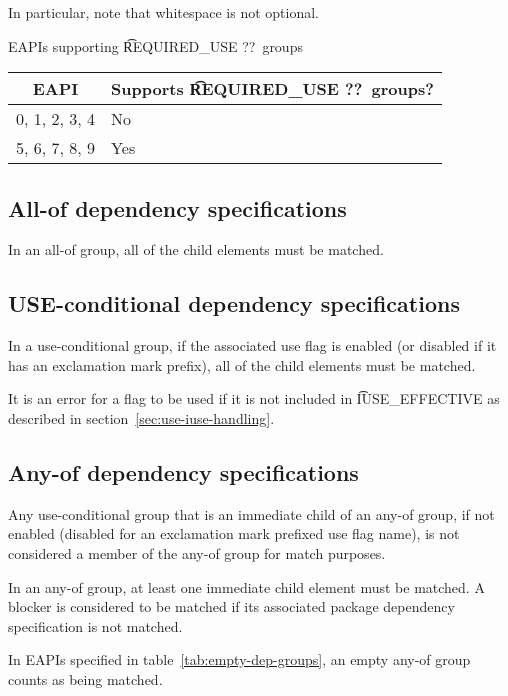 In particular, note that whitespace is not optional.

\begin{centertable}{EAPIs supporting \t{REQUIRED_USE ??}\ groups}
    \label{tab:at-most-one-of-table}
    \begin{tabular}{ll}
      \toprule
      \multicolumn{1}{c}{\textbf{EAPI}} &
      \multicolumn{1}{c}{\textbf{Supports \t{REQUIRED_USE ??}\ groups?}} \\
      \midrule
      0, 1, 2, 3, 4     & No  \\
      5, 6, 7, 8, 9     & Yes \\
      \bottomrule
    \end{tabular}
\end{centertable}

\subsection{All-of dependency specifications}

In an all-of group, all of the child elements must be matched.

\subsection{USE-conditional dependency specifications}

In a use-conditional group, if the associated use flag is enabled (or disabled if it has an
exclamation mark prefix), all of the child elements must be matched.

It is an error for a flag to be used if it is not included in \t{IUSE_EFFECTIVE} as described in
section~\ref{sec:use-iuse-handling}.

\subsection{Any-of dependency specifications}

Any use-conditional group that is an immediate child of an any-of group, if not enabled (disabled
for an exclamation mark prefixed use flag name), is not considered a member of the any-of group
for match purposes.

In an any-of group, at least one immediate child element must be matched. A blocker is
considered to be matched if its associated package dependency specification is not matched.

 In EAPIs specified in table~\ref{tab:empty-dep-groups}, an empty
any-of group counts as being matched.

